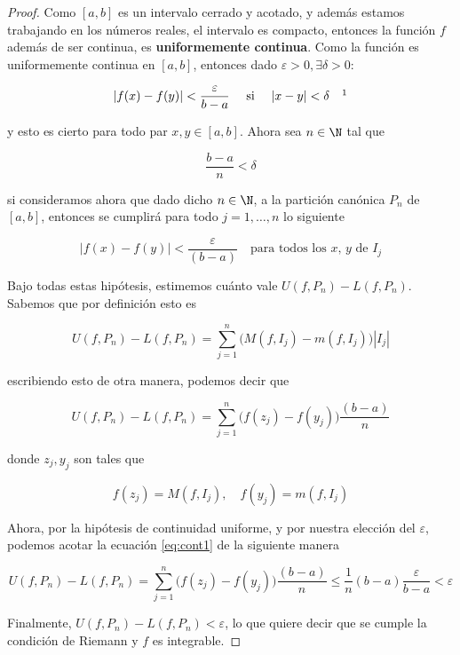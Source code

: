 \begin{proof}
    Como $[a,b]$ es un intervalo cerrado y acotado, y además estamos trabajando en los números reales, el intervalo es compacto, entonces la función $f$ además de ser continua, es \textbf{uniformemente continua}. Como la función es uniformemente continua en $[a,b]$, entonces dado $\varepsilon > 0, \exists \delta >0:$
    
    \[
    |f(x) - f(y)| < \frac{\varepsilon}{b-a} \quad \text{ si } \quad |x-y| < \delta \quad \footnotemark
    \]
    
    \noindent y esto es cierto para todo par $x, y \in [a,b]$. Ahora sea $n \in \N$ tal que
    
    \[
    \frac{b-a}{n} < \delta
    \]
    
    \noindent si consideramos ahora que dado dicho $n \in \N$, a la partición canónica $P_n$ de $[a,b]$, entonces se cumplirá para todo $j=1, \dots, n$ lo siguiente
    
    \[
    |f(x) - f(y)| < \frac{\varepsilon}{(b-a)} \quad \text{para todos los $x$, $y$ de } I_j
    \]
    
    Bajo todas estas hipótesis, estimemos cuánto vale $U(f,P_n) - L(f,P_n)$. Sabemos que por definición esto es
    
    \[
    U(f,P_n) - L(f,P_n) = \sum_{j=1}^n \big( M(f,I_j) - m(f,I_j) \big)|I_j|
    \]
    
    \noindent escribiendo esto de otra manera, podemos decir que
    
    \begin{equation}\label{eq:cont1}
    U(f,P_n) - L(f,P_n) = \sum_{j=1}^n \big( f(z_j) - f(y_j) \big) \frac{(b-a)}{n}
    \end{equation}
    
    \noindent donde $z_j, y_j$ son tales que
    
    \[
    f(z_j) = M(f,I_j), \quad f(y_j) = m(f, I_j)
    \]
    
    Ahora, por la hipótesis de continuidad uniforme, y por nuestra elección del $\varepsilon$, podemos acotar la ecuación \ref{eq:cont1} de la siguiente manera
    
    \[
    U(f,P_n) - L(f,P_n) = \sum_{j=1}^n \big( f(z_j) - f(y_j) \big) \frac{(b-a)}{n} \leq \frac{1}{n} (b-a) \frac{\varepsilon}{b-a} < \varepsilon
    \]
    
    Finalmente, $U(f,P_n) - L(f,P_n) < \varepsilon$, lo que quiere decir que se cumple la condición de Riemann y $f$ es integrable.
\end{proof}